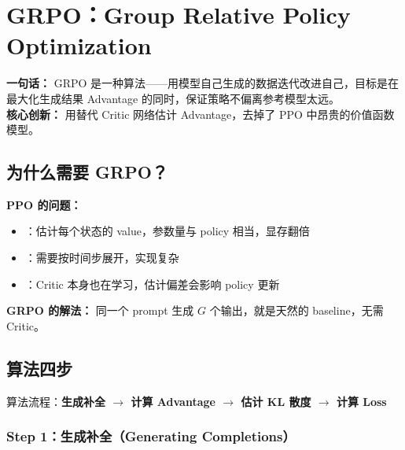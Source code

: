 
\section{GRPO：Group Relative Policy Optimization}

\begin{conceptbox}
\textbf{一句话：} GRPO 是一种算法——用模型自己生成的数据迭代改进自己，目标是在最大化生成结果 Advantage 的同时，保证策略不偏离参考模型太远。\\
\textbf{核心创新：} 用替代 Critic 网络估计 Advantage，去掉了 PPO 中昂贵的价值函数模型。
\end{conceptbox}

\subsection{为什么需要 GRPO？}

\textbf{PPO 的问题：}

\begin{itemize}[leftmargin=1.5em]
  \item {}：估计每个状态的 value，参数量与 policy 相当，显存翻倍
  \item {}：需要按时间步展开，实现复杂
  \item {}：Critic 本身也在学习，估计偏差会影响 policy 更新
\end{itemize}

\textbf{GRPO 的解法：} 同一个 prompt 生成 $G$ 个输出，就是天然的 baseline，无需 Critic。

\subsection{算法四步}

算法流程：\textbf{生成补全 $\to$ 计算 Advantage $\to$ 估计 KL 散度 $\to$ 计算 Loss}

\subsubsection{Step 1：生成补全（Generating Completions）}


